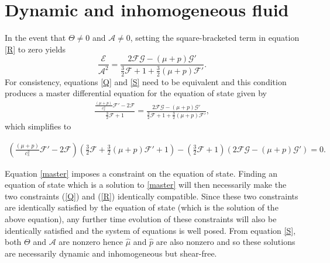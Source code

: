 \documentclass[abstract=on,notitlepage,superscriptaddress,nofootinbib,aps,showpacs,twocolumn,prd]{revtex4}
\newcommand{\0}{^{(0)}}
\newcommand{\1}{^{(1)}}
\newcommand{\2}{^{(2)}}
\newcommand{\3}{{}^{(3)}}
\begin{document}
\section{Dynamic and inhomogeneous fluid}
In the event that $\Theta \neq 0$ and $\mathcal{A} \neq 0$,  setting the square-bracketed term in equation \eqref{R} to zero yields
\begin{equation}
	\frac{\mathcal{E}}{\mathcal{A}^2}=\frac{2\mathcal{F}\mathcal{G}-(\mu+p)\mathcal{G}'}{\frac{3}{2}\mathcal{F}+1+\frac{3}{2}(\mu+p)\mathcal{F}'}. \label{S}
\end{equation}
 For consistency, equations \eqref{Q} and \eqref{S} need to be equivalent and this condition produces a master differential equation for the equation of state given by
\begin{eqnarray}
	\frac{\frac{(\mu+p)}{c_s^2}\mathcal{F}'-2\mathcal{F}}{\frac{3}{2}\mathcal{F}+1} = \frac{2\mathcal{F}\mathcal{G}-(\mu+p)\mathcal{G}'}{\frac{3}{2}\mathcal{F}+1+\frac{3}{2}(\mu+p)\mathcal{F}'}, \nonumber
\end{eqnarray}
which simplifies to
\begin{widetext}
\begin{eqnarray}\label{master}
	 \left(\frac{(\mu+p)}{c_s^2}\mathcal{F}'-2\mathcal{F}\right)\left(\frac{3}{2}\mathcal{F}+\frac{3}{2}(\mu+p)\mathcal{F}'  + 1 \right) -\left(\frac{3}{2}\mathcal{F}+1\right)\left(2\mathcal{F}\mathcal{G}-(\mu+p)\mathcal{G}'\right)  = 0.
\end{eqnarray}
\end{widetext}
Equation \eqref{master} imposes a constraint on the equation of state. Finding an equation of state which is a solution to \eqref{master} will then necessarily make the two constraints (\ref{Q}) and (\ref{R}) identically compatible. Since these two constraints are identically satisfied by the equation of state (which is the solution of the above equation), any further time evolution of these constraints will also be identically satisfied and the system of equations is well posed. From equation \eqref{S}, both $\Theta$ and $\mathcal{A}$ are nonzero hence $\hat{\mu}$ and $\hat{p}$ are also nonzero and so these solutions are necessarily dynamic and inhomogeneous but shear-free.
\end{document}
